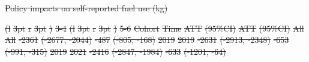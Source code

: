 \documentclass[
  letterpaper,
  DIV=11,
  numbers=noendperiod]{scrartcl}
\makeatletter
\renewenvironment{table}%
   {\renewcommand\familydefault\sfdefault
    \@float{table}}
   {\end@float}
\providecommand{\DIFdel}[1]{{\protect\color{red}\sout{#1}}}                      %
\providecommand{\DIFdelbegin}{} %
\providecommand{\DIFdelFL}[1]{\DIFdel{#1}} %
\providecommand{\DIFaddbeginFL}{} %
\providecommand{\DIFaddendFL}{} %
\providecommand{\DIFdelbeginFL}{} %
\providecommand{\DIFdelendFL}{} %
\newcommand{\DIFscaledelfig}{0.5}
\newlength{\DIFdelgraphicswidth} %
\newlength{\DIFdelgraphicsheight} %
\newcommand{\DIFaddincludegraphics}[2][]{{\color{blue}\fbox{\DIFOincludegraphics[#1]{#2}}}} %
\newcommand{\DIFdelincludegraphics}[2][]{%
\sbox{\DIFdelgraphicsbox}{\DIFOincludegraphics[#1]{#2}}%
\settoboxwidth{\DIFdelgraphicswidth}{\DIFdelgraphicsbox} %
\settoboxtotalheight{\DIFdelgraphicsheight}{\DIFdelgraphicsbox} %
\scalebox{\DIFscaledelfig}{%
\parbox[b]{\DIFdelgraphicswidth}{\usebox{\DIFdelgraphicsbox}\\[-\baselineskip] \rule{\DIFdelgraphicswidth}{0em}}\llap{\resizebox{\DIFdelgraphicswidth}{\DIFdelgraphicsheight}{%
\setlength{\unitlength}{\DIFdelgraphicswidth}%
\begin{picture}(1,1)%
\thicklines\linethickness{2pt} %
{\color[rgb]{1,0,0}\put(0,0){\framebox(1,1){}}}%
{\color[rgb]{1,0,0}\put(0,0){\line( 1,1){1}}}%
{\color[rgb]{1,0,0}\put(0,1){\line(1,-1){1}}}%
\end{picture}%
}\hspace*{3pt}}} %
} %
\DeclareRobustCommand{\DIFdelbegin}{\DIFOdelbegin \let\includegraphics\DIFdelincludegraphics} %
\DeclareRobustCommand{\DIFaddbeginFL}{\DIFOaddbeginFL \let\includegraphics\DIFaddincludegraphics} %
\DeclareRobustCommand{\DIFaddendFL}{\DIFOaddendFL \let\includegraphics\DIFOincludegraphics} %
\DeclareRobustCommand{\DIFdelbeginFL}{\DIFOdelbeginFL \let\includegraphics\DIFdelincludegraphics} %
\DeclareRobustCommand{\DIFdelendFL}{\DIFOaddendFL \let\includegraphics\DIFOincludegraphics} %
\makeatother
\begin{document}
\DIFdelbegin %
{%
\DIFdelFL{Policy impacts on self-reported fuel use (kg) }}%
\DIFdelendFL \DIFaddbeginFL \begin{table}
\DIFaddendFL 

\DIFdelbeginFL %
\DIFdelFL{(l}%
\DIFdelFL{3pt}%
\DIFdelFL{r}%
\DIFdelFL{3pt}%
\DIFdelFL{)}%
\DIFdelFL{3-4}%
\DIFdelFL{(l}%
\DIFdelFL{3pt}%
\DIFdelFL{r}%
\DIFdelFL{3pt}%
\DIFdelFL{)}%
\DIFdelFL{5-6}%
\DIFdelFL{Cohort }%
\DIFdelFL{Time }%
\DIFdelFL{ATT }%
\DIFdelFL{(95\%CI) }%
\DIFdelFL{ATT }%
\DIFdelFL{(95\%CI)}%
\DIFdelFL{All }%
\DIFdelFL{All }%
\DIFdelFL{-2361 }%
\DIFdelFL{(-2677, -2044) }%
\DIFdelFL{-487 }%
\DIFdelFL{(-805, -168)}%
\DIFdelFL{2019 }%
\DIFdelFL{2019 }%
\DIFdelFL{-2631 }%
\DIFdelFL{(-2913, -2348) }%
\DIFdelFL{-653 }%
\DIFdelFL{(-991, -315)}%
\DIFdelFL{2019 }%
\DIFdelFL{2021 }%
\DIFdelFL{-2416 }%
\DIFdelFL{(-2847, -1984) }%
\DIFdelFL{-633 }%
\DIFdelFL{(-1201, -64)}%

\end{table}
\end{document}
